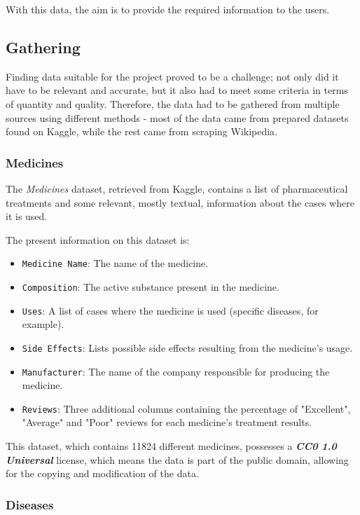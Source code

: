 \documentclass[sigconf]{acmart}
\begin{document}
With this data, the aim is to provide the required information to the users.

\subsection{Gathering}

Finding data suitable for the project proved to be a challenge; not only did it have to be relevant and accurate, but it also had to meet some criteria in terms of quantity and quality. Therefore, the data had to be gathered from multiple sources using different methods - most of the data came from prepared datasets found on Kaggle\cite{kaggle}, while the rest came from scraping Wikipedia\cite{wikipedia}.

\subsubsection{Medicines}

The \textit{Medicines} dataset\cite{medicines_dataset}, retrieved from Kaggle, contains a list of pharmaceutical treatments and some relevant, mostly textual, information about the cases where it is used.

The present information on this dataset is:
\begin{itemize}
	\item {\texttt{Medicine Name}}: The name of the medicine.
	\item {\texttt{Composition}}: The active substance present in the medicine.
	\item {\texttt{Uses}}: A list of cases where the medicine is used (specific diseases, for example).
	\item {\texttt{Side Effects}}: Lists possible side effects resulting from the medicine's usage.
	\item {\texttt{Manufacturer}}: The name of the company responsible for producing the medicine.
	\item {\texttt{Reviews}}: Three additional columns containing the percentage of "Excellent", "Average" and "Poor" reviews for each medicine's treatment results.
\end{itemize}

This dataset, which contains 11824 different medicines, possesses a {\textit{\textbf{CC0 1.0 Universal}}}\cite{cczero} license, which means the data is part of the public domain, allowing for the copying and modification of the data.

\subsubsection{Diseases}
\end{document}
